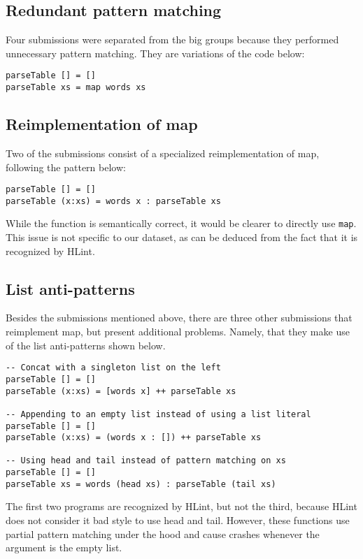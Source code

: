 \subsection{Redundant pattern matching}

Four submissions were separated from the big groups because they performed unnecessary pattern matching. They are variations of the code below:

\begin{verbatim}
parseTable [] = []
parseTable xs = map words xs
\end{verbatim}

\subsection{Reimplementation of map}

Two of the submissions consist of a specialized reimplementation of map, following the pattern below:

\begin{verbatim}
parseTable [] = []
parseTable (x:xs) = words x : parseTable xs
\end{verbatim}

While the function is semantically correct, it would be clearer to directly use \texttt{map}. This issue is not specific to our dataset, as can be deduced from the fact that it is recognized by HLint.

\subsection{List anti-patterns}

Besides the submissions mentioned above, there are three other submissions that reimplement map, but present additional problems. Namely, that they make use of the list anti-patterns shown below.

\begin{verbatim}
-- Concat with a singleton list on the left
parseTable [] = []
parseTable (x:xs) = [words x] ++ parseTable xs

-- Appending to an empty list instead of using a list literal
parseTable [] = []
parseTable (x:xs) = (words x : []) ++ parseTable xs

-- Using head and tail instead of pattern matching on xs
parseTable [] = []
parseTable xs = words (head xs) : parseTable (tail xs)
\end{verbatim}

The first two programs are recognized by HLint, but not the third, because HLint does not consider it bad style to use head and tail. However, these functions use partial pattern matching under the hood and cause crashes whenever the argument is the empty list.

